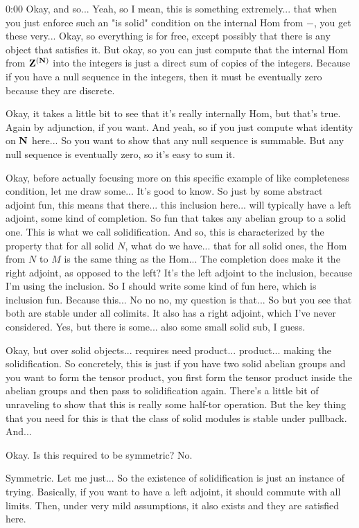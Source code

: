\begin{unfinished}{0:00}
Okay, and so... Yeah, so I mean, this is something extremely... that when you just enforce such an "is solid" condition on the internal Hom from $-$, you get these very... Okay, so everything is for free, except possibly that there is any object that satisfies it. But okay, so you can just compute that the internal Hom from $\mathbf Z^{(\mathbf N)}$ into the integers is just a direct sum of copies of the integers. Because if you have a null sequence in the integers, then it must be eventually zero because they are discrete.

Okay, it takes a little bit to see that it's really internally Hom, but that's true. Again by adjunction, if you want. And yeah, so if you just compute what identity on $\mathbf N$ here... So you want to show that any null sequence is summable. But any null sequence is eventually zero, so it's easy to sum it.

Okay, before actually focusing more on this specific example of like completeness condition, let me draw some... It's good to know. So just by some abstract adjoint fun, this means that there... this inclusion here... will typically have a left adjoint, some kind of completion. So fun that takes any abelian group to a solid one. This is what we call solidification. And so, this is characterized by the property that for all solid $N$, what do we have... that for all solid ones, the Hom from $N$ to $M$ is the same thing as the Hom... The completion does make it the right adjoint, as opposed to the left? It's the left adjoint to the inclusion, because I'm using the inclusion. So I should write some kind of fun here, which is inclusion fun. Because this... No no no, my question is that... So but you see that both are stable under all colimits. It also has a right adjoint, which I've never considered. Yes, but there is some... also some small solid sub, I guess.

Okay, but over solid objects... requires need product... product... making the solidification. So concretely, this is just if you have two solid abelian groups and you want to form the tensor product, you first form the tensor product inside the abelian groups and then pass to solidification again. There's a little bit of unraveling to show that this is really some half-tor operation. But the key thing that you need for this is that the class of solid modules is stable under pullback. And...

Okay. Is this required to be symmetric? No.

Symmetric. Let me just... So the existence of solidification is just an instance of trying. Basically, if you want to have a left adjoint, it should commute with all limits. Then, under very mild assumptions, it also exists and they are satisfied here.


\end{unfinished}
